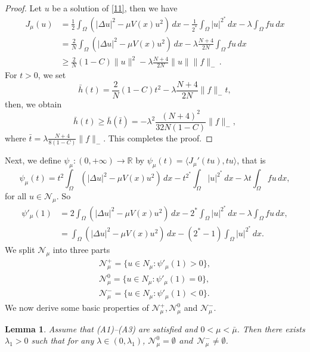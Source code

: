 \documentclass[10pt,a4paper]{amsart}
\numberwithin{equation}{section}
\newtheorem{lemma}[theorem]{Lemma}
\begin{document}
\begin{proof}
 Let \(u\) be a solution of \eqref{11}, then we have
\begin{align*}
J_\mu (u)
&=\frac{1}{2}\int_{\Omega}(|\Delta u|^2-\mu V(x)u^2)\,dx-\frac{1}{2^*} \int_{\Omega} |u|^{2^*}\,dx-\lambda \int_{\Omega} fu\,dx\\
&=\frac{2}{N}\int_{\Omega}(|\Delta u|^2-\mu V(x)u^2)\,dx-\lambda\frac{N+4}{2N} \int_{\Omega} fu\,dx\\
&\geq \frac{2}{N}(1-C)\|u\|^2-\lambda \frac{N+4}{2N}\|u\|\|f\|_-\,.
\end{align*}
 For \(t>0\), we set
 \[
 \bar{h}(t)= \frac{2}{N}(1-C)t^2-\lambda \frac{N+4}{2N}\|f\|_-t,
 \]
 then, we obtain
\[
 \bar{h}(t)\geq \bar{h}(\bar{t})=-\lambda^2\frac{(N+4)^2}{32N(1-C)}\|f\|_-,
\]
where
 \(\bar {t}=\lambda \frac{N+4}{8(1-C)}\|f\|_-\). This completes the proof.
\end{proof}

 Next, we define \(\psi _\mu: (0, +\infty)\to \mathbb{R}\) by 
 \(\psi _\mu(t)=\langle J_{\mu}'(tu), tu\rangle\), that is
\[
 \psi _\mu(t)= t^2\int_{\Omega}(|\Delta u|^2-\mu V(x)u^2)\,dx-t^{2^*} \int_{\Omega}|u|^{2^*}\,dx-\lambda t \int_{\Omega}fu\,dx,
\]
for all \(u\in \mathcal{N}_\mu\). So
\begin{align*}
 \psi' _\mu(1) 
 &=2 \int_{\Omega}\left( |\Delta u|^2-\mu V(x)u^2\right)\,dx - 2^*\int_{\Omega}|u|^{2^*}\,dx -\lambda \int_{\Omega}fu\,dx, \\ \label{1}
 &=\int_{\Omega}\left( |\Delta u|^2-\mu V(x)u^2\right)\,dx -(2^*-1)\int_{\Omega}|u|^{2^*}\,dx.
\end{align*}
We split \(\mathcal{N}_\mu\) into three parts
\begin{gather*}
 \mathcal{N}_\mu^+= \{u\in N_\mu: \psi' _\mu(1) >0\},\\
\mathcal{N}_\mu^0= \{u\in N_\mu: \psi' _\mu(1) =0\}, \\
 \mathcal{N}_\mu^-= \{u\in N_\mu: \psi' _\mu(1)<0\}. 
\end{gather*}
We now derive some basic properties of \(\mathcal{N}_\mu^+, \mathcal{N}_\mu^0\) and 
\(\mathcal{N}_\mu^-\).

\begin{lemma}\label{l2}
Assume that {\rm (A1)--(A3)} are satisfied and \(0<\mu<\bar{\mu}\). 
Then there exists \(\lambda_1>0\) such that for any \(\lambda \in (0,\lambda_1)\), 
\(\mathcal{N}_\mu^0=\emptyset \ \ and \ \ \mathcal{N}_\mu^- \neq\emptyset\).
\end{lemma}
\end{document}
